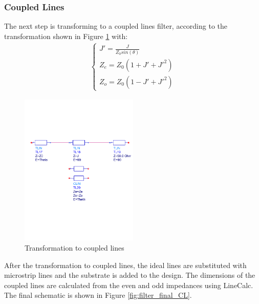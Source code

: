 \documentclass[a4paper]{article}        %
\begin{document}
  \subsubsection{Coupled Lines}

  	The next step is transforming to a coupled lines filter, according to the transformation shown in Figure \ref{fig:filter_CL_transform} with:
  	\begin{align}
  		\begin{cases}
  			J' = \frac{J}{Z_0 sin(\theta)} \\
  			Z_e = Z_0 (1 + J' + J'^2) \\
  			Z_o = Z_0 (1 - J' + J'^2)
  		\end{cases}
  	\end{align}

  	\begin{figure}[H]
  		\centering
  		\includegraphics[width=0.5\textwidth]{fig/Filter/2nd_order/CL_transformation.pdf}
  		\caption{Transformation to coupled lines}
  		\label{fig:filter_CL_transform}
  	\end{figure} 

  	After the transformation to coupled lines, the ideal lines are substituted with microstrip lines and the substrate is added to the design. The dimensions of the coupled lines are calculated from the even and odd impedances using LineCalc. The final schematic is shown in Figure \ref{fig:filter_final_CL}. 
\end{document}
